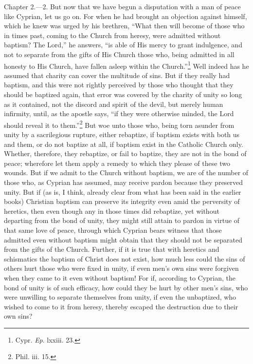 Chapter 2.—2. But now that we have begun a disputation with a man of peace like Cyprian, let us go on. For when he had brought an objection against himself, which he knew was urged by his brethren, ``What then will become of those who in times past, coming to the Church from heresy, were admitted without baptism? The Lord,'' he answers, ``is able of His mercy to grant indulgence, and not to separate from the gifts of His Church those who, being admitted in all honesty to His Church, have fallen asleep within the Church.''\footnote{\par  Cypr. \emph{Ep}. lxxiii. 23.} Well indeed has he assumed that charity can cover the multitude of sins. But if they really had baptism, and this were not rightly perceived by those who thought that they should be baptized again, that error was covered by the charity of unity so long as it contained, not the discord and spirit of the devil, but merely human infirmity, until, as the apostle says, ``if they were otherwise minded, the Lord should reveal it to them.''\footnote{\par  Phil. iii. 15.} But woe unto those who, being torn asunder from unity by a sacrilegious rupture, either rebaptize, if baptism exists with both us and them, or do not baptize at all, if baptism exist in the Catholic Church only. Whether, therefore, they rebaptize, or fail to baptize, they are not in the bond of peace; wherefore let them apply a remedy to which they please of these two wounds. But if we admit to the Church without baptism, we are of the number of those who, as Cyprian has assumed, may receive pardon because they preserved unity. But if (as is, I think, already clear from what has been said in the earlier books) Christian baptism can preserve its integrity even amid the perversity of heretics, then even though any in those times did rebaptize, yet without departing from the bond of unity, they might still attain to pardon in virtue of that same love of peace, through which Cyprian bears witness that those admitted even without baptism might obtain that they should not be separated from the gifts of the Church. Further, if it is true that with heretics and schismatics the baptism of Christ does not exist, how much less could the sins of others hurt those who were fixed in unity, if even men’s own sins were forgiven when they came to it even without baptism! For if, according to Cyprian, the bond of unity is of such efficacy, how could they be hurt by other men’s sins, who were unwilling to separate themselves from unity, if even the unbaptized, who wished to come to it from heresy, thereby escaped the destruction due to their own sins?

